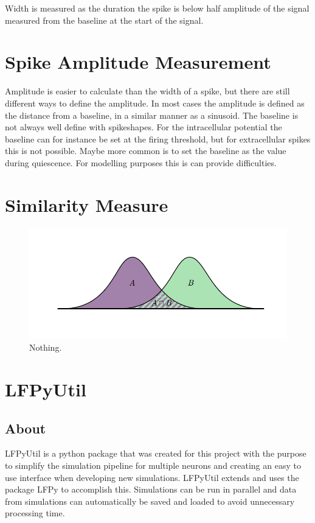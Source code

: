 \documentclass[altfont, fleqn]{uiophd}
\begin{document}
Width is measured as the duration the spike is below half amplitude of the signal measured
from the baseline at the start of the signal. 
\newline


\section{Spike Amplitude Measurement}
Amplitude is easier to calculate than the width of a spike, 
but there are still different ways to define the amplitude. 
In most cases the amplitude is defined as the distance from a baseline,
in a similar manner as a sinusoid.
The baseline is not always well define with spikeshapes.
For the intracellular potential the baseline can for instance be set
at the firing threshold, but for extracellular spikes this is not possible.
Maybe more common is to set
the baseline as the value during quiescence. 
For modelling purposes this is can provide difficulties.

\section{Similarity Measure}
\begin{figure}[h]
    \begin{center}
        \includegraphics[width=1\textwidth]{images/sec_3/hist_inter.pdf}
        \caption{
            Nothing.
        }
        \label{fig:3_hist_inter}
    \end{center}
\end{figure}
\section{LFPyUtil}
\subsection{About}
LFPyUtil is a python package that was created for this project with the purpose
to simplify the simulation pipeline for multiple neurons and creating
an easy to use interface when developing new simulations. 
LFPyUtil extends and uses the package LFPy to accomplish this. 
Simulations can be run in parallel and data from simulations can
automatically be saved and loaded to avoid unnecessary processing time.
\end{document}
